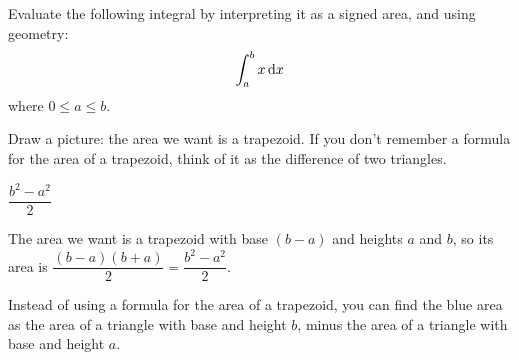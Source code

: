 \begin{question}\label{1.1trapezoidarea}
Evaluate the following integral by interpreting it as a signed area, and using geometry:
\[\int_a^b x \,\mathrm{d}x\]
where $0 \leq a \leq b$.
\end{question}
\begin{hint}
Draw a picture: the area we want is a trapezoid. If you don't remember a formula for the area of a trapezoid, think of it as the difference of two triangles.
\end{hint}
\begin{answer}
$\dfrac{b^2-a^2}{2}$
\end{answer}
\begin{solution}
The area we want is a trapezoid with base $(b-a)$ and heights $a$ and $b$, so its area is $\dfrac{(b-a)(b+a)}{2}=\dfrac{b^2-a^2}{2}$.
\begin{center}
\end{center}
Instead of using a formula for the area of a trapezoid, you can find the blue area as the area of a triangle with base and height $b$, minus the area of a triangle with base and height $a$.
\end{solution}

